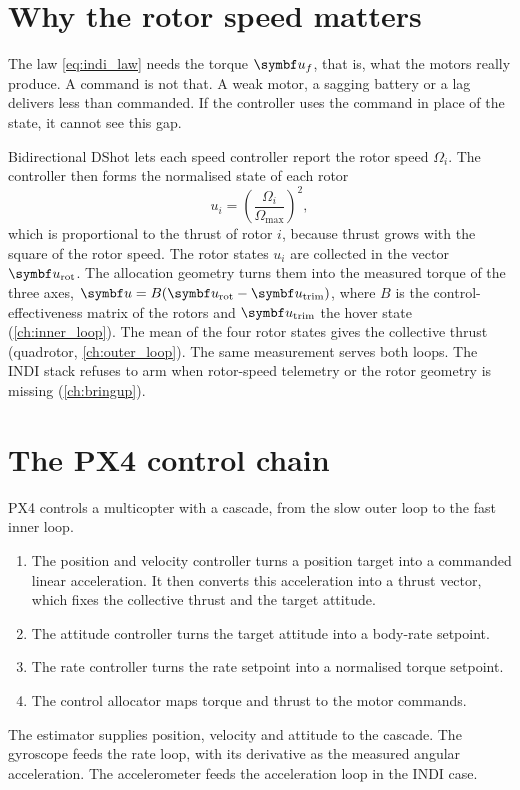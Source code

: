 \section{Why the rotor speed matters}\label{sec:rotor_speed}

The law \cref{eq:indi_law} needs the torque $\vect{u}_f$, that is, what the motors really produce.
A command is not that.
A weak motor, a sagging battery or a lag delivers less than commanded.
If the controller uses the command in place of the state, it cannot see this gap.

Bidirectional DShot lets each speed controller report the rotor speed $\Omega_i$.
The controller then forms the normalised state of each rotor
\begin{equation}\label{eq:u_state}
  u_i = \left(\frac{\Omega_i}{\Omega_{\max}}\right)^{2} ,
\end{equation}
which is proportional to the thrust of rotor $i$, because thrust grows with the square of the rotor speed.
The rotor states $u_i$ are collected in the vector $\vect u_{\mathrm{rot}}$.
The allocation geometry turns them into the measured torque of the three axes, $\vect u = B(\vect u_{\mathrm{rot}}-\vect u_{\mathrm{trim}})$, where $B$ is the control-effectiveness matrix of the rotors and $\vect u_{\mathrm{trim}}$ the hover state (\cref{ch:inner_loop}).
The mean of the four rotor states gives the collective thrust (quadrotor, \cref{ch:outer_loop}).
The same measurement serves both loops.
The INDI stack refuses to arm when rotor-speed telemetry or the rotor geometry is missing (\cref{ch:bringup}).

\section{The PX4 control chain}\label{sec:px4_chain}

PX4 controls a multicopter with a cascade, from the slow outer loop to the fast inner loop.
\begin{enumerate}
  \item The position and velocity controller turns a position target into a commanded linear acceleration.
    It then converts this acceleration into a thrust vector, which fixes the collective thrust and the target attitude.
  \item The attitude controller turns the target attitude into a body-rate setpoint.
  \item The rate controller turns the rate setpoint into a normalised torque setpoint.
  \item The control allocator maps torque and thrust to the motor commands.
\end{enumerate}
The estimator supplies position, velocity and attitude to the cascade.
The gyroscope feeds the rate loop, with its derivative as the measured angular acceleration.
The accelerometer feeds the acceleration loop in the INDI case.

